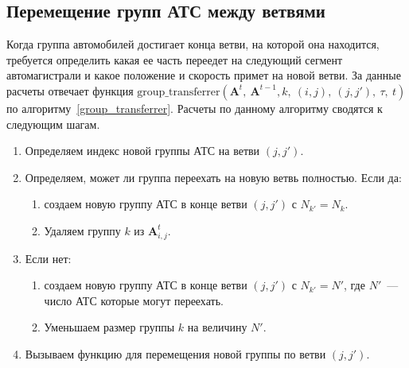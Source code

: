 \subsection{Перемещение групп АТС между ветвями}
Когда группа автомобилей достигает конца ветви, на которой она находится, требуется определить какая ее часть переедет на
следующий сегмент автомагистрали и какое положение и скорость примет на новой ветви.
За данные расчеты отвечает функция \(\text{group\_transferrer}(\mathbf{A}^t,\ \mathbf{A}^{t-1}, k,\ (i,j),\ (j,j'),\ \tau,\ t)\) по алгоритму~\ref{group_transferrer}.
Расчеты по данному алгоритму сводятся к следующим шагам.
\begin{enumerate}[leftmargin=2.05cm,label=Шаг \arabic*.,ref=\arabic*]
  \item Определяем индекс новой группы АТС на ветви \((j,j')\).
  \item Определяем, может ли группа переехать на новую ветвь полностью. Если да:
  \begin{enumerate}
    \item создаем новую группу АТС в конце ветви \((j,j')\) с \(N_{k'} = N_k\).
    \item Удаляем группу \(k\) из \(\mathbf{A}^t_{i,j}\).
  \end{enumerate}
  \item Если нет:
    \begin{enumerate}
    \item создаем новую группу АТС в конце ветви \((j,j')\) с \(N_{k'} = N'\), где \(N'\)~--- число АТС которые могут переехать.
    \item Уменьшаем размер группы \(k\) на величину \(N'\).
  \end{enumerate}
  \item Вызываем функцию для перемещения новой группы по ветви \((j,j')\).
\end{enumerate}

